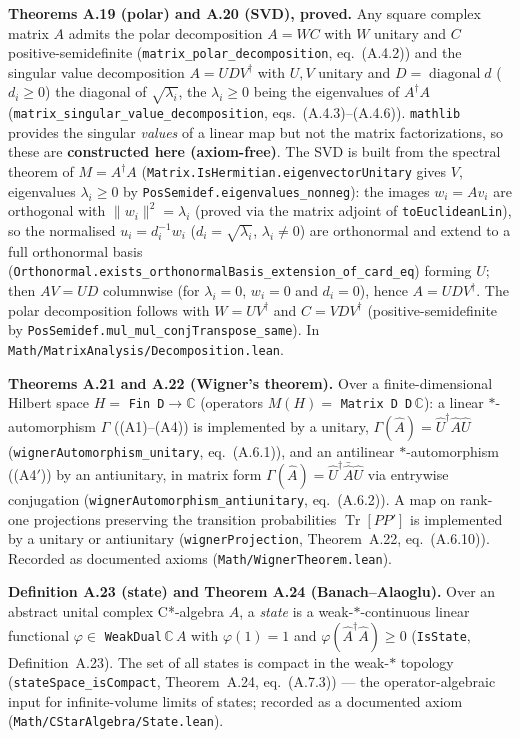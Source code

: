 \documentclass[a4paper,11pt]{article}
\begin{document}
\medskip\noindent\textbf{Theorems A.19 (polar) and A.20 (SVD), proved.}  Any square complex matrix
$A$ admits the polar decomposition $A=WC$ with $W$ unitary and $C$ positive-semidefinite
(\texttt{matrix\_polar\_decomposition}, eq.~(A.4.2)) and the singular value decomposition
$A=UDV^\dagger$ with $U,V$ unitary and $D=\operatorname{diagonal}d$ ($d_i\ge0$) the diagonal of
$\sqrt{\lambda_i}$, the $\lambda_i\ge0$ being the eigenvalues of $A^\dagger A$
(\texttt{matrix\_singular\_value\_decomposition}, eqs.~(A.4.3)--(A.4.6)).  \texttt{mathlib} provides
the singular \emph{values} of a linear map but not the matrix factorizations, so these are
\textbf{constructed here (axiom-free)}.  The SVD is built from the spectral theorem of
$M=A^\dagger A$ (\texttt{Matrix.IsHermitian.eigenvectorUnitary} gives $V$, eigenvalues
$\lambda_i\ge0$ by \texttt{PosSemidef.eigenvalues\_nonneg}): the images $w_i=A v_i$ are orthogonal
with $\lVert w_i\rVert^2=\lambda_i$ (proved via the matrix adjoint of \texttt{toEuclideanLin}), so the
normalised $u_i=d_i^{-1}w_i$ ($d_i=\sqrt{\lambda_i}$, $\lambda_i\ne0$) are orthonormal and extend to a
full orthonormal basis (\texttt{Orthonormal.exists\_orthonormalBasis\_extension\_of\_card\_eq})
forming $U$; then $A V=U D$ columnwise (for $\lambda_i=0$, $w_i=0$ and $d_i=0$), hence $A=UDV^\dagger$.
The polar decomposition follows with $W=UV^\dagger$ and $C=VDV^\dagger$ (positive-semidefinite by
\texttt{PosSemidef.mul\_mul\_conjTranspose\_same}).  In
\texttt{Math/MatrixAnalysis/Decomposition.lean}.

\medskip\noindent\textbf{Theorems A.21 and A.22 (Wigner's theorem).}  Over a
finite-dimensional Hilbert space $H=$ \texttt{Fin\,D}$\to\mathbb C$ (operators $M(H)=$
\texttt{Matrix D D}$\,\mathbb C$): a linear $*$-automorphism $\Gamma$ ((A1)--(A4)) is implemented by a
unitary, $\Gamma(\hat A)=\hat U^\dagger\hat A\hat U$ (\texttt{wignerAutomorphism\_unitary}, eq.~(A.6.1)),
and an antilinear $*$-automorphism ((A4$'$)) by an antiunitary, in matrix form
$\Gamma(\hat A)=\hat U^\dagger\bar{\hat A}\hat U$ via entrywise conjugation
(\texttt{wignerAutomorphism\_antiunitary}, eq.~(A.6.2)).  A map on rank-one projections preserving the
transition probabilities $\operatorname{Tr}[P P']$ is implemented by a unitary or antiunitary
(\texttt{wignerProjection}, Theorem~A.22, eq.~(A.6.10)).  Recorded as documented axioms
(\texttt{Math/WignerTheorem.lean}).

\medskip\noindent\textbf{Definition A.23 (state) and Theorem A.24 (Banach--Alaoglu).}  Over an
abstract unital complex C*-algebra $A$, a \emph{state} is a weak-$*$-continuous linear functional
$\varphi\in$ \texttt{WeakDual}$\,\mathbb C\,A$ with $\varphi(1)=1$ and $\varphi(\hat A^\dagger\hat A)\ge0$
(\texttt{IsState}, Definition~A.23).  The set of all states is compact in the weak-$*$ topology
(\texttt{stateSpace\_isCompact}, Theorem~A.24, eq.~(A.7.3)) --- the operator-algebraic input for
infinite-volume limits of states; recorded as a documented axiom
(\texttt{Math/CStarAlgebra/State.lean}).
\end{document}
